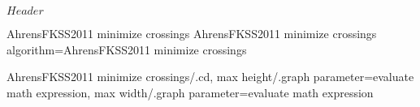 %
%
%

\ProvidesFileRCS[v\pgfversion] $Header$




%
%
%
%

\pgfgddeclarealgorithmkey
{AhrensFKSS2011 minimize crossings}
{AhrensFKSS2011 minimize crossings}
{%
  algorithm=AhrensFKSS2011 minimize crossings
}

\pgfgdset
{%
  AhrensFKSS2011 minimize crossings/.cd,
  max height/.graph parameter=evaluate math expression,
  max width/.graph parameter=evaluate math expression
}



\endinput